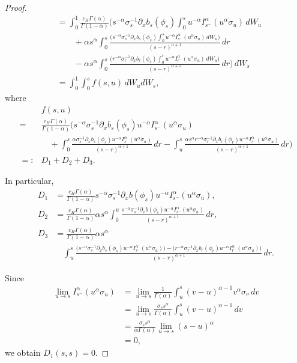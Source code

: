 \documentclass[10pt,a4paper]{amsart}
\begin{document}
\begin{proof}
\begin{align*}
	&=\int_0^1  \frac{c_H\Gamma(\alpha)}{\Gamma(1-\alpha)} 
	\Bigg(
	 		s^{-\alpha}\sigma_s^{-1}\partial_x b_s(\phi_s)
	 		\int_0^s u^{-\alpha}I_{s^-}^\alpha (u^\alpha  \sigma_u)\, dW_u  \\ %
	 		&\qquad+\alpha s^\alpha\int_0^s \frac{ 
	 		\big(s^{-\alpha}\sigma_s^{-1}\partial_x b_s(\phi_s)\int_0^s u^{-\alpha}I_{s^{-}}^\alpha (u^\alpha  \sigma_u)\, dW_u\big) 
		}{(s-r)^{\alpha+1}}\,dr  \\ %
        &\qquad-\alpha s^\alpha\int_0^s \frac{ 
	 		\big(r^{-\alpha}\sigma_r^{-1}\partial_x b_r(\phi_r)\int_0^r u^{-\alpha}I_{r^-}^\alpha (u^\alpha  \sigma_u)\, dW_u\big) 
		}{(s-r)^{\alpha+1}}\,dr \Bigg)\, dW_s \\ %
		&=\int_0^1 \int_0^s f(s,u)\, dW_u dW_s, %
\end{align*}
where   
\begin{align*}
	&f(s,u)\\
    =&\frac{c_H\Gamma(\alpha)}{\Gamma(1-\alpha)}	
	\Bigg(
	 		s^{-\alpha}\sigma_s^{-1}\partial_x b_s(\phi_s)u^{-\alpha}I_{s^-}^\alpha (u^\alpha  \sigma_u)  \\
	 		&\quad+\int_0^s \frac{\alpha \sigma_s^{-1}\partial_x b_s(\phi_s)u^{-\alpha}I_{s^-}^\alpha (u^\alpha \sigma_u)}{(s-r)^{\alpha+1}}\,dr
		 -\int_u^s  \frac{\alpha s^\alpha r^{-\alpha} \sigma_r^{-1}\partial_x b_r
         (\phi_r) u^{-\alpha}I_{r^-}^\alpha (u^\alpha \sigma_u) }{(s-r)^{\alpha+1}}\,dr \Bigg) \\
		=:&D_1+D_2+D_3.
\end{align*}

In particular,
\begin{align*}
    D_1 &= \frac{c_H\Gamma(\alpha)}{\Gamma(1-\alpha)} s^{-\alpha}\sigma_s^{-1}\partial_x b(\phi_s)u^{-\alpha}I_{s^-}^\alpha (u^\alpha \sigma_u),   \\
    D_2 &=  \frac{c_H\Gamma(\alpha)}{\Gamma(1-\alpha)} \alpha s^\alpha\int_0^u \frac{ s^{-\alpha}\sigma_s^{-1}\partial_x b(\phi_s)u^{-\alpha}I_{s^-}^\alpha (u^\alpha \sigma_u)}{(s-r)^{\alpha+1}}\,dr, \\
    D_3 &=  \frac{c_H\Gamma(\alpha)}{\Gamma(1-\alpha)} \alpha s^\alpha  \\
    &\quad \int_u^s \frac{ 
		\big(s^{-\alpha}\sigma_s^{-1}\partial_x b_s(\phi_s)u^{-\alpha}I_{s^-}^\alpha (u^\alpha\sigma_u)\big) 
		-\big(r^{-\alpha}\sigma_r^{-1}\partial_x b_r(\phi_r)u^{-\alpha}I_{r^-}^\alpha (u^\alpha\sigma_u)\big)}
		{(s-r)^{\alpha+1}}\,dr . 
\end{align*}

Since 
\begin{align*}
	\lim_{u\to s} I_{s^-}^\alpha (u^\alpha  \sigma_u) 
	&=\lim_{u\to s}\frac{1}{\Gamma(\alpha)}\int_u^s (v-u)^{\alpha-1} v^\alpha  \sigma_v\,dv\\
	&=\lim_{u\to s}\frac{\sigma_s s^\alpha}{\Gamma(\alpha)}\int_u^s (v-u)^{\alpha-1}\,dv\\
	&=\frac{\sigma_s s^\alpha}{\alpha\Gamma(\alpha)}\lim_{u\to s} (s-u)^\alpha\\
	&=0,
\end{align*}
we obtain $D_1(s,s)=0.$


\end{proof}
\end{document}
